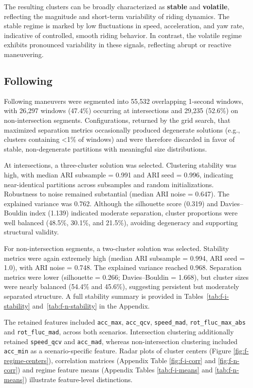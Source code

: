 The resulting clusters can be broadly characterized as \textbf{stable} and \textbf{volatile}, reflecting the magnitude and short-term variability of riding dynamics. The stable regime is marked by low fluctuations in speed, acceleration, and yaw rate, indicative of controlled, smooth riding behavior. In contrast, the volatile regime exhibits pronounced variability in these signals, reflecting abrupt or reactive maneuvering.

\subsection{Following}

Following maneuvers were segmented into 55,532 overlapping 1-second windows, with 26,297 windows (47.4\%) occurring at intersections and 29,235 (52.6\%) on non-intersection segments. Configurations, returned by the grid search, that maximized separation metrics occasionally produced degenerate solutions (e.g., clusters containing <1\% of windows) and were therefore discarded in favor of stable, non-degenerate partitions with meaningful size distributions.

At intersections, a three-cluster solution was selected. Clustering stability was high, with median ARI subsample = 0.991 and ARI seed = 0.996, indicating near-identical partitions across subsamples and random initializations. Robustness to noise remained substantial (median ARI noise = 0.647). The explained variance was 0.762. Although the silhouette score (0.319) and Davies–Bouldin index (1.139) indicated moderate separation, cluster proportions were well balanced (48.5\%, 30.1\%, and 21.5\%), avoiding degeneracy and supporting structural validity.

For non-intersection segments, a two-cluster solution was selected. Stability metrics were again extremely high (median ARI subsample = 0.994, ARI seed = 1.0), with ARI noise = 0.748. The explained variance reached 0.968. Separation metrics were lower (silhouette = 0.266; Davies–Bouldin = 1.668), but cluster sizes were nearly balanced (54.4\% and 45.6\%), suggesting persistent but moderately separated structure.
A full stability summary is provided in Tables~\ref{tab:f-i-stability} and~\ref{tab:f-n-stability} in the Appendix.

The retained features included \verb|acc_max|, \verb|acc_qcv|, \verb|speed_mad|, \verb|rot_fluc_max_abs| and \verb|rot_fluc_mad|, across both scenarios. Intersection clustering additionally retained \verb|speed_qcv| and \verb|acc_mad|, whereas non-intersection clustering included \verb|acc_min| as a scenario-specific feature. Radar plots of cluster centers (Figure \ref{fig:f-regime-centers}), correlation matrices (Appendix Table \ref{fig:f-i-corr} and \ref{fig:f-n-corr}) and regime feature means (Appendix Tables \ref{tab:f-i-means} and \ref{tab:f-n-means}) illustrate feature-level distinctions.


